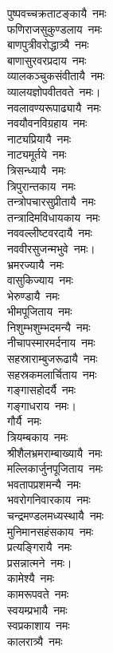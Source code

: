 \begin{multicols}{2}
\begin{flushleft}
पुष्पवच्चक्रताटङ्कायै~नमः\\
फणिराजसुकुण्डलाय~नमः\\
बाणपुत्रीवरोद्धात्र्यै~नमः\\
बाणासुरवरप्रदाय~नमः\\
व्यालकञ्चुकसंवीतायै~नमः\\
व्यालयज्ञोपवीतवते~नमः।\hfill{}\\
नवलावण्यरूपाढ्यायै~नमः\\
नवयौवनविग्रहाय~नमः\\
नाट्यप्रियायै~नमः\\
नाट्यमूर्तये~नमः\\
त्रिसन्ध्यायै~नमः\\
त्रिपुरान्तकाय~नमः\\
तन्त्रोपचारसुप्रीतायै~नमः\\
तन्त्रादिमविधायकाय~नमः\\
नववल्लीष्टवरदायै~नमः\\
नववीरसुजन्मभुवे~नमः।\hfill{}\\
भ्रमरज्यायै~नमः\\
वासुकिज्याय~नमः\\
भेरुण्डायै~नमः\\
भीमपूजिताय~नमः\\
निशुम्भशुम्भदमन्यै~नमः\\
नीचापस्मारमर्दनाय~नमः\\
सहस्राराम्बुजरूढायै~नमः\\
सहस्रकमलार्चिताय~नमः\\
गङ्गासहोदर्यै~नमः\\
गङ्गाधराय~नमः।\hfill{}\\
गौर्यै~नमः\\
त्रियम्बकाय~नमः\\
श्रीशैलभ्रमराम्बाख्यायै~नमः\\
मल्लिकार्जुनपूजिताय~नमः\\
भवतापप्रशमन्यै~नमः\\
भवरोगनिवारकाय~नमः\\
चन्द्रमण्डलमध्यस्थायै~नमः\\
मुनिमानसहंसकाय~नमः\\
प्रत्यङ्गिरायै~नमः\\
प्रसन्नात्मने~नमः।\hfill{}\\
कामेश्यै~नमः\\
कामरूपवते~नमः\\
स्वयम्प्रभायै~नमः\\
स्वप्रकाशाय~नमः\\
कालरात्र्यै~नमः\\

\end{flushleft}
\end{multicols}
